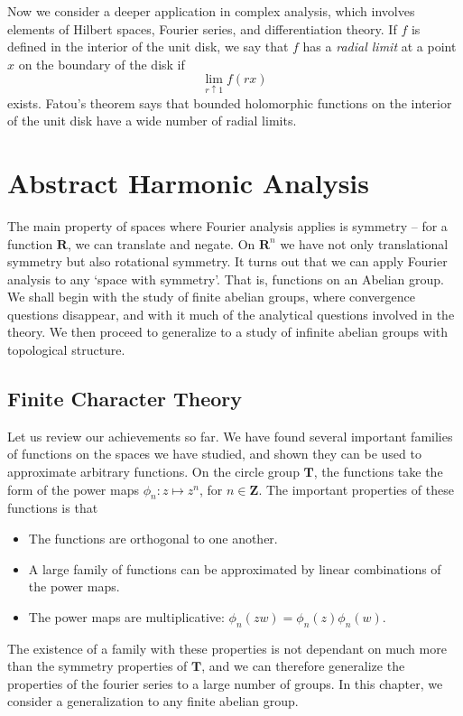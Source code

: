 Now we consider a deeper application in complex analysis, which involves elements of Hilbert spaces, Fourier series, and differentiation theory. If $f$ is defined in the interior of the unit disk, we say that $f$ has a {\it radial limit} at a point $x$ on the boundary of the disk if
%
\[ \lim_{r \uparrow 1} f(rx) \]
%
exists. Fatou's theorem says that bounded holomorphic functions on the interior of the unit disk have a wide number of radial limits.


\part{Abstract Harmonic Analysis}

The main property of spaces where Fourier analysis applies is symmetry -- for a function $\mathbf{R}$, we can translate and negate. On $\mathbf{R}^n$ we have not only translational symmetry but also rotational symmetry. It turns out that we can apply Fourier analysis to any `space with symmetry'. That is, functions on an Abelian group. We shall begin with the study of finite abelian groups, where convergence questions disappear, and with it much of the analytical questions involved in the theory. We then proceed to generalize to a study of infinite abelian groups with topological structure.


\chapter{Finite Character Theory}

Let us review our achievements so far. We have found several important families of functions on the spaces we have studied, and shown they can be used to approximate arbitrary functions. On the circle group $\mathbf{T}$, the functions take the form of the power maps $\phi_n: z \mapsto z^n$, for $n \in \mathbf{Z}$. The important properties of these functions is that
%
\begin{itemize}
    \item The functions are orthogonal to one another.
    \item A large family of functions can be approximated by linear combinations of the power maps.
    \item The power maps are multiplicative: $\phi_n(zw) = \phi_n(z) \phi_n(w)$.
\end{itemize}
%
The existence of a family with these properties is not dependant on much more than the symmetry properties of $\mathbf{T}$, and we can therefore generalize the properties of the fourier series to a large number of groups. In this chapter, we consider a generalization to any finite abelian group.

